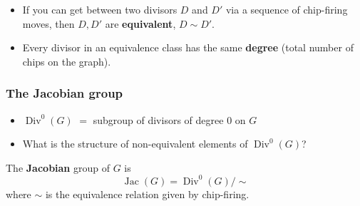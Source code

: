 \documentclass[mathserif, serif, xcolor=dvipsnames]{beamer}
\DeclareMathOperator{\Jac}{Jac}
\DeclareMathOperator{\Div}{Div}
\begin{document}
\begin{frame}
\begin{center}
\end{center}

\begin{itemize}

\pause
\item
If you can get between two divisors $D$ and $D'$ via a sequence of
chip-firing moves, then $D,D'$ are \textbf{equivalent}, $D\sim D'$.

\pause
\item Every divisor in an equivalence class has the same
  \textbf{degree} (total number of chips on the graph).

\end{itemize}

\end{frame}

\begin{frame}
  \frametitle{The Jacobian group}
  \begin{itemize}
  \item $\Div^0(G)$ $=$ subgroup of divisors of degree $0$
    on $G$
    \pause
  \item What is the structure of non-equivalent elements of $\Div^0(G)$?
  \end{itemize}
  \pause
  \begin{definition}
    The \textbf{Jacobian} group of $G$ is
    \begin{equation*}
      \Jac(G) = \Div^0(G)/\sim
    \end{equation*}
    where $\sim$ is the equivalence relation given by chip-firing.
  \end{definition}
\end{frame}
\end{document}
